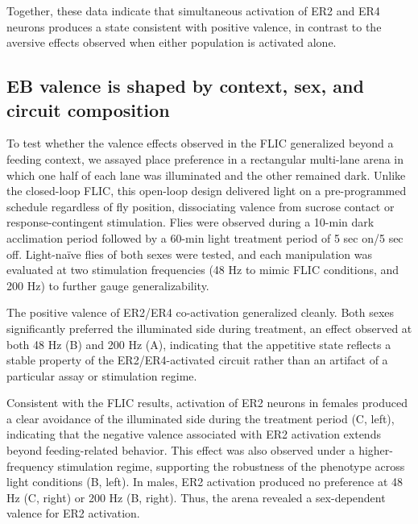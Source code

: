 Together, these data indicate that simultaneous activation of ER2 and ER4 neurons produces a state consistent with positive valence, in contrast to the aversive effects observed when either population is activated alone.

\subsection*{EB valence is shaped by context, sex, and circuit composition}
To test whether the valence effects observed in the FLIC generalized beyond a feeding context, we assayed place preference in a rectangular multi-lane arena in which one half of each lane was illuminated and the other remained dark. 
Unlike the closed-loop FLIC, this open-loop design delivered light on a pre-programmed schedule regardless of fly position, dissociating valence from sucrose contact or response-contingent stimulation.
Flies were observed during a 10-min dark acclimation period followed by a 60-min light treatment period of 5 sec on/5 sec off.
Light-naïve flies of both sexes were tested, and each manipulation was evaluated at two stimulation frequencies (48 Hz to mimic FLIC conditions, and 200 Hz) to further gauge generalizability. 

The positive valence of ER2/ER4 co-activation generalized cleanly. 
Both sexes significantly preferred the illuminated side during treatment, an effect observed at both 48 Hz (B) and 200 Hz (A), indicating that the appetitive state reflects a stable property of the ER2/ER4-activated circuit rather than an artifact of a particular assay or stimulation regime. 

Consistent with the FLIC results, activation of ER2 neurons in females produced a clear avoidance of the illuminated side during the treatment period (C, left), indicating that the negative valence associated with ER2 activation extends beyond feeding-related behavior. 
This effect was also observed under a higher-frequency stimulation regime, supporting the robustness of the phenotype across light conditions (B, left). 
In males, ER2 activation produced no preference at 48 Hz (C, right) or 200 Hz (B, right). 
Thus, the arena revealed a sex-dependent valence for ER2 activation.

